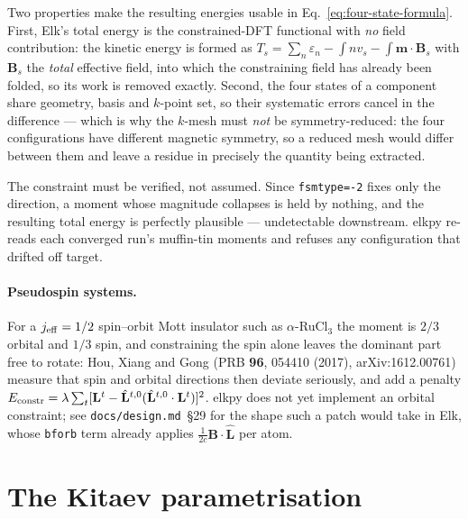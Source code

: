 \documentclass[11pt]{article}
\begin{document}
Two properties make the resulting energies usable in
Eq.~\eqref{eq:four-state-formula}. First, Elk's total energy is the
constrained-DFT functional with \emph{no} field contribution: the kinetic energy
is formed as $T_s=\sum_{n}\varepsilon_n-\int n v_s-\int\mathbf m\cdot\mathbf B_s$
with $\mathbf B_s$ the \emph{total} effective field, into which the constraining
field has already been folded, so its work is removed exactly. Second, the four
states of a component share geometry, basis and $k$-point set, so their
systematic errors cancel in the difference --- which is why the $k$-mesh must
\emph{not} be symmetry-reduced: the four configurations have different magnetic
symmetry, so a reduced mesh would differ between them and leave a residue in
precisely the quantity being extracted.

The constraint must be verified, not assumed. Since \texttt{fsmtype=-2} fixes
only the direction, a moment whose magnitude collapses is held by nothing, and
the resulting total energy is perfectly plausible --- undetectable downstream.
elkpy re-reads each converged run's muffin-tin moments and refuses any
configuration that drifted off target.

\paragraph{Pseudospin systems.} For a $j_{\rm eff}=1/2$ spin--orbit Mott
insulator such as $\alpha$-RuCl$_3$ the moment is $2/3$ orbital and $1/3$ spin,
and constraining the spin alone leaves the dominant part free to rotate: Hou,
Xiang and Gong (PRB \textbf{96}, 054410 (2017), arXiv:1612.00761) measure that
spin and orbital directions then deviate seriously, and add a penalty
$E_{\rm constr}=\lambda\sum_t[\mathbf L^t-\hat{\mathbf L}^{t,0}(\hat{\mathbf L}^{t,0}\cdot\mathbf L^t)]^2$.
elkpy does not yet implement an orbital constraint; see
\texttt{docs/design.md}~\S29 for the shape such a patch would take in Elk, whose
\texttt{bforb} term already applies $\tfrac{1}{2c}\mathbf B\cdot\hat{\mathbf L}$
per atom.

\section{The Kitaev parametrisation}
\end{document}
